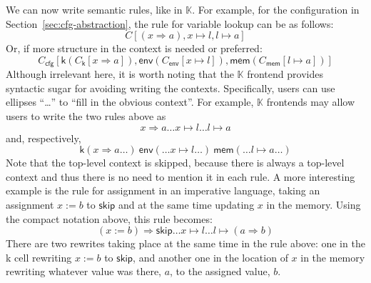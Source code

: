 \documentclass[UTF8,11pt]{article}
\theoremstyle{plain}
\theoremstyle{definition}
\theoremstyle{remark}
\newcommand{\K}{\mbox{$\mathbb{K}$}\xspace}
\begin{document}
We can now write semantic rules, like in \K.
For example, for the configuration in Section~\ref{sec:cfg-abstraction},
the rule for variable lookup can be as follows:
$$C[(x \Rightarrow a),x\mapsto l,l\mapsto a]$$
Or, if more structure in the context is needed or preferred:
$$
C_{\textsf{cfg}}[\textsf{k}(C_{\textsf{k}}[x \Rightarrow a]),\textsf{env}(C_{\textsf{env}}[x\mapsto l]),\textsf{mem}(C_{\textsf{mem}}[l\mapsto a])]
$$
Although irrelevant here, it is worth noting that the \K frontend
provides syntactic sugar for avoiding writing the contexts.
Specifically, users can use ellipses ``\dots'' to
``fill in the obvious context''.
For example, \K frontends may allow users to write the two rules above as
$$
x \Rightarrow a \dots x \mapsto l \dots l \mapsto a
$$
and, respectively,
$$
\textsf{k}(x \Rightarrow a \dots) \ \textsf{env}(\dots x\mapsto l \dots) \ 
\textsf{mem}(\dots l\mapsto a \dots)
$$
Note that the top-level context is skipped, because there is always a
top-level context and thus there is no need to mention it in each rule.
A more interesting example is the rule for assignment in an imperative
language, taking an assignment $x := b$ to $\textsf{skip}$ and at the
same time updating $x$ in the memory.
Using the compact notation above, this rule becomes:
$$
(x := b)\Rightarrow \textsf{skip} \dots x \mapsto l \dots l \mapsto (a \Rightarrow b)
$$
There are two rewrites taking place at the same time in the rule above:
one in the \textsf{k} cell rewriting $x := b$ to $\textsf{skip}$, and another
one in the location of $x$ in the memory rewriting whatever value was there,
$a$, to the assigned value, $b$.
\end{document}
